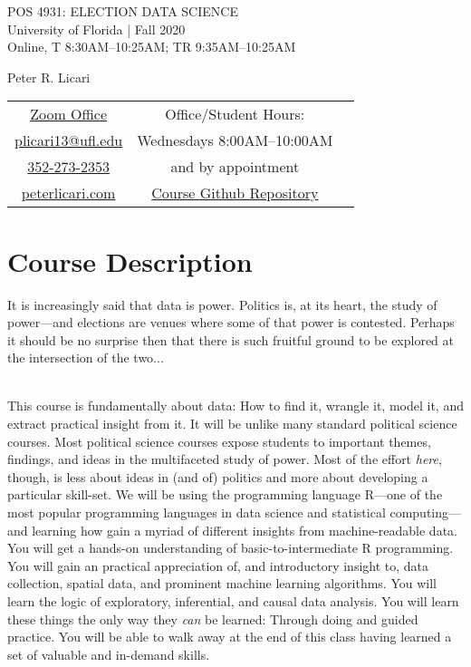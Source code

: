 \documentclass[11pt]{article}
\begin{document}
\begin{center}
{\Huge POS 4931: ELECTION DATA SCIENCE}\\\vspace{1mm}
{\Large University of Florida | Fall 2020}\\\vspace{1mm}
{\Large Online, T 8:30AM--10:25AM; TR 9:35AM--10:25AM}
\end{center}
\bigskip
\begin{center}
{\LARGE Peter R. Licari}\\\vspace{5mm}
\setlength{\tabcolsep}{20pt}
\begin{tabular}{ c c c}
  {\href{https://ufl.zoom.us/j/8174990226}{Zoom Office}} & Office/Student Hours:\\
    {\href{mailto:plicari13@ufl.edu}{plicari13@ufl.edu}} & Wednesdays 8:00AM--10:00AM \\
  {\href{tel:3522732353}{352-273-2353}} &  and by appointment \\
  {\href{https://www.peterlicari.com}{peterlicari.com}} & \href{https://github.com/prlitics/Election-Data-Science-Fall-2020}{Course Github Repository}
\end{tabular}
\end{center}

\begin{center}
\tableofcontents
\end{center}

\section{Course Description} 

It is increasingly said that data is power. Politics is, at its heart, the study of power---and elections are venues where some of that power is contested. Perhaps it should be no surprise then that there is such fruitful ground to be explored at the intersection of the two...
\\\

This course is fundamentally about data: How to find it, wrangle it, model it, and extract practical insight from it. It will be unlike many standard political science courses. Most political science courses expose students to important themes, findings, and ideas in the multifaceted study of power. Most of the effort \textit{here}, though, is less about ideas in (and of) politics and more about developing a particular skill-set. We will be using the programming language R---one of the most popular programming languages in data science and statistical computing---and learning how gain a myriad of different insights from machine-readable data. You will get a hands-on understanding of basic-to-intermediate R programming. You will gain an practical appreciation of, and introductory insight to, data collection, spatial data, and prominent machine learning algorithms. You will learn the logic of exploratory, inferential, and causal data analysis. You will learn these things the only way they \textit{can} be learned: Through doing and guided practice. You will be able to walk away at the end of this class having learned a set of valuable and in-demand skills.
\\\
\end{document}
